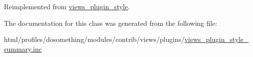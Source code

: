 Reimplemented from \hyperlink{classviews__plugin__style_aa52b618e91b11a7d10ad1feadbc891f1}{views\_\-plugin\_\-style}.

The documentation for this class was generated from the following file:\begin{DoxyCompactItemize}
\item 
html/profiles/dosomething/modules/contrib/views/plugins/\hyperlink{views__plugin__style__summary_8inc}{views\_\-plugin\_\-style\_\-summary.inc}\end{DoxyCompactItemize}
